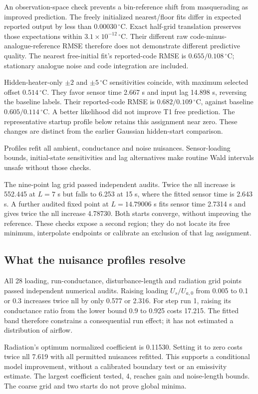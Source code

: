 \documentclass[10pt,letterpaper]{article}
\newcommand{\C}{\,^\circ\mathrm{C}}
\begin{document}
An observation-space check prevents a bin-reference shift from masquerading
as improved prediction. The freely initialized nearest/floor fits differ in
expected reported output by less than $0.00030\C$. Exact half-grid translation
preserves those expectations within $3.1\times10^{-12}\C$. Their different raw
code-minus-analogue-reference RMSE therefore does not demonstrate different
predictive quality. The nearest free-initial fit's reported-code RMSE is
$0.655/0.108\C$; stationary analogue noise and code integration are included.

Hidden-heater-only $\pm2$ and $\pm5\C$ sensitivities coincide, with maximum
selected offset $0.514\C$. They favor sensor time 2.667 s and input lag
14.898 s, reversing the baseline labels. Their reported-code RMSE is
$0.682/0.109\C$, against baseline $0.605/0.114\C$. A better likelihood did
not improve T1 free prediction. The representative startup profile below retains this assignment near zero.
These changes are distinct from the earlier Gaussian hidden-start comparison.

Profiles refit all ambient, conductance and noise nuisances. Sensor-loading
bounds, initial-state sensitivities and lag alternatives make routine Wald
intervals unsafe without those checks.

The nine-point lag grid passed independent audits. Twice the nll increase is
552.445 at $L=7$ s but falls to 6.253 at 15 s, where the fitted sensor time
is 2.643 s. A further audited fixed point at $L=14.79006$ s fits sensor time
2.7314 s and gives twice the nll increase 4.78730. Both starts converge, without
improving the reference. These checks expose a second region; they do not
locate its free minimum, interpolate endpoints or calibrate an exclusion of
that lag assignment.

\subsection*{What the nuisance profiles resolve}
All 28 loading, run-conductance, disturbance-length and radiation grid points
passed independent numerical audits. Raising loading $U_s/U_{a,0}$ from 0.005
to 0.1 or 0.3 increases twice nll by only 0.577 or 2.316. For step run 1,
raising its conductance ratio from the lower bound 0.9 to 0.925 costs 17.215.
The fitted band therefore constrains a consequential run effect; it has not
estimated a distribution of airflow.

Radiation's optimum normalized coefficient is 0.11530. Setting it to zero
costs twice nll 7.619 with all permitted nuisances refitted. This supports a
conditional model improvement, without a calibrated boundary test or an
emissivity estimate. The largest coefficient tested, 4, reaches gain and
noise-length bounds. The coarse grid and two starts do not prove global minima.
\end{document}
